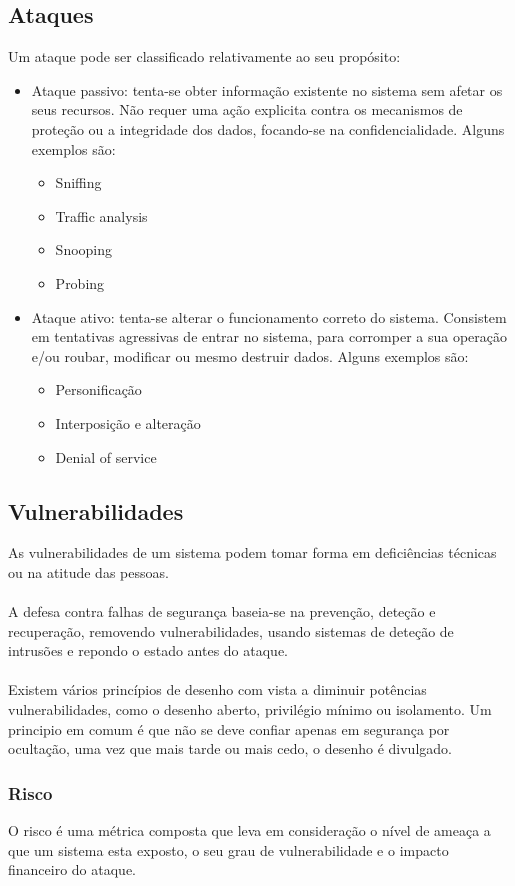 \documentclass[10pt,a4paper]{report}
\begin{document}
\subsection{Ataques}
Um ataque pode ser classificado relativamente ao seu propósito:
\begin{itemize}
\item Ataque passivo: tenta-se obter informação existente no sistema sem afetar os seus recursos.  Não requer uma ação explicita contra os mecanismos de proteção ou a integridade dos dados, focando-se na confidencialidade. Alguns exemplos são:
\begin{itemize}
\item Sniffing
\item Traffic analysis
\item Snooping
\item Probing
\end{itemize}
\item Ataque ativo: tenta-se alterar o funcionamento correto do sistema. Consistem em tentativas agressivas de entrar no sistema, para corromper a sua operação e/ou roubar, modificar ou mesmo destruir dados. Alguns exemplos são:
\begin{itemize}
\item Personificação
\item Interposição e alteração
\item Denial of service
\end{itemize}
\end{itemize}
\subsection{Vulnerabilidades}
As vulnerabilidades de um sistema podem tomar forma em deficiências técnicas ou na atitude das pessoas.\\
\\
A defesa contra falhas de segurança baseia-se na prevenção, deteção e recuperação, removendo vulnerabilidades, usando sistemas de deteção de intrusões e repondo o estado antes do ataque.\\
\\
Existem vários princípios de desenho com vista a diminuir potências vulnerabilidades, como o desenho aberto, privilégio mínimo ou isolamento. Um principio em comum é que não se deve confiar apenas em segurança por ocultação, uma vez que mais tarde ou mais cedo, o desenho é divulgado.
\subsubsection{Risco}
O risco é uma métrica composta que leva em consideração o nível de ameaça a que um sistema esta exposto, o seu grau de vulnerabilidade e o impacto financeiro do ataque.
\end{document}

